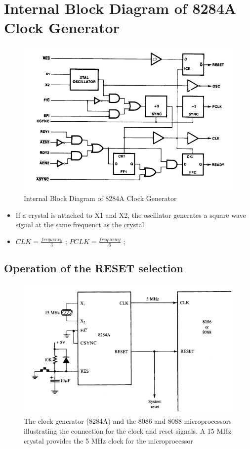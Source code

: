 \section{Internal Block Diagram of 8284A Clock Generator}
\begin{figure}[h!]
    \centering
    \includegraphics[width = 1.2\textwidth]{./figures/8284A_internal.png}
    \caption{Internal Block Diagram of 8284A Clock Generator}
    \label{fig:b2}
\end{figure}

\begin{itemize}
  \item If a crystal is attached to X1 and X2, the oscillator generates a square wave signal at the same frequenct as the crystal
  \item $CLK = \frac{frequency}{3}$ ; $PCLK = \frac{frequency}{6}$ ;
\end{itemize}
\newpage
\subsection{Operation of the RESET selection}
\begin{figure}[h!]
    \centering
    \includegraphics[width = 1.1\textwidth]{./figures/8284A_reset.png}
    \caption{The clock generator (8284A) and the 8086 and 8088 microprocessors illustrating
the connection for the clock and reset signals. A 15 MHz crystal provides the 5 MHz clock for the
microprocessor}
    \label{fig:b3}
\end{figure}

